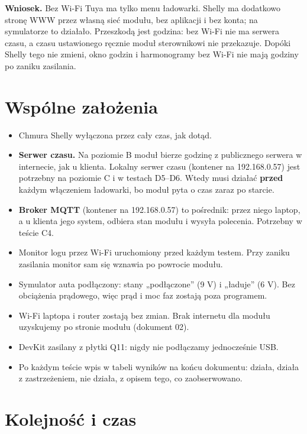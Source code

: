 \documentclass[11pt,a4paper]{article}
\begin{document}
\textbf{Wniosek.} Bez Wi-Fi Tuya ma tylko menu ładowarki. Shelly ma dodatkowo stronę WWW przez własną sieć modułu, bez aplikacji i bez konta; na symulatorze to działało. Przeszkodą jest godzina: bez Wi-Fi nie ma serwera czasu, a czasu ustawionego ręcznie moduł sterownikowi nie przekazuje. Dopóki Shelly tego nie zmieni, okno godzin i harmonogramy bez Wi-Fi nie mają godziny po zaniku zasilania.


\section{Wspólne założenia}

\begin{itemize}
\item Chmura Shelly wyłączona przez cały czas, jak dotąd.
\item \textbf{Serwer czasu.} Na poziomie B moduł bierze godzinę z publicznego serwera w internecie, jak u klienta. Lokalny serwer czasu (kontener na 192.168.0.57) jest potrzebny na poziomie C i w testach D5–D6. Wtedy musi działać \textbf{przed} każdym włączeniem ładowarki, bo moduł pyta o czas zaraz po starcie.
\item \textbf{Broker MQTT} (kontener na 192.168.0.57) to pośrednik: przez niego laptop, a u klienta jego system, odbiera stan modułu i wysyła polecenia. Potrzebny w teście C4.
\item Monitor logu przez Wi-Fi uruchomiony przed każdym testem. Przy zaniku zasilania monitor sam się wznawia po powrocie modułu.
\item Symulator auta podłączony: stany „podłączone” (9 V) i „ładuje” (6 V). Bez obciążenia prądowego, więc prąd i moc faz zostają poza programem.
\item Wi-Fi laptopa i router zostają bez zmian. Brak internetu dla modułu uzyskujemy po stronie modułu (dokument 02).
\item DevKit zasilany z płytki Q11: nigdy nie podłączamy jednocześnie USB.
\item Po każdym teście wpis w tabeli wyników na końcu dokumentu:  działa,  działa z zastrzeżeniem,  nie działa, z opisem tego, co zaobserwowano.
\end{itemize}

\section{Kolejność i czas}
\end{document}
